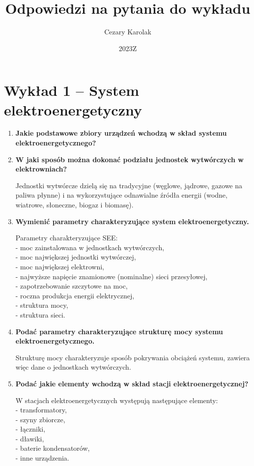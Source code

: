 \documentclass[12pt]{article}
\title{Odpowiedzi na pytania do wykładu}
\author{Cezary Karolak}
\date{2023Z}
\newcommand{\pytanie}[1]{\item \textbf{#1}}
\begin{document}
\maketitle
\tableofcontents
\newpage

\section{Wykład 1 -- System elektroenergetyczny}
\begin{enumerate}
    \pytanie{Jakie podstawowe zbiory urządzeń wchodzą w skład systemu elektroenergetycznego?}
    
    \pytanie{W jaki sposób można dokonać podziału jednostek wytwórczych w elektrowniach?}
    
        Jednostki wytwórcze dzielą się na tradycyjne (węglowe, jądrowe, gazowe na paliwa płynne) i na wykorzystujące odnawialne źródła energii (wodne, wiatrowe, słoneczne, biogaz i biomasę).

    \pytanie{Wymienić parametry charakteryzujące system elektroenergetyczny.}
    
        Parametry charakteryzujące SEE:\\
        - moc zainstalowana w jednostkach wytwórczych,\\
        - moc największej jednostki wytwórczej,\\
        - moc największej elektrowni,\\
        - najwyższe napięcie znamionowe (nominalne) sieci przesyłowej,\\
        - zapotrzebowanie szczytowe na moc,\\
        - roczna produkcja energii elektrycznej,\\
        - struktura mocy,\\
        - struktura sieci.

    \pytanie{Podać parametry charakteryzujące strukturę mocy systemu elektroenergetycznego.}
    
        Strukturę mocy charakteryzuje sposób pokrywania obciążeń systemu, zawiera więc dane o jednostkach wytwórczych.

    \pytanie{Podać jakie elementy wchodzą w skład stacji elektroenergetycznej?}
    
        W stacjach elektroenergetycznych występują następujące elementy:\\
        - transformatory,\\
        - szyny zbiorcze,\\
        - łączniki,\\
        - dławiki,\\
        - baterie kondensatorów,\\
        - inne urządzenia.


\end{enumerate}
\end{document}
